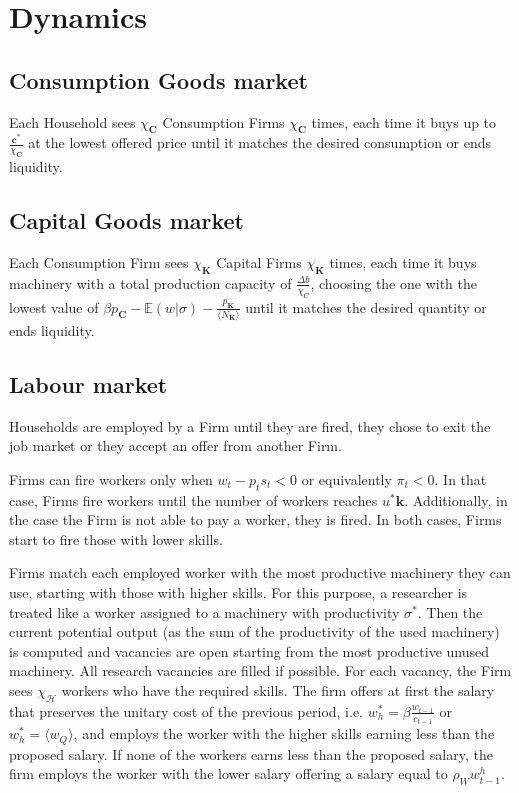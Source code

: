 \documentclass[a4paper, headings=standardclasses]{scrartcl}
\numberwithin{equation}{subsection}
\begin{document}
\section{Dynamics}
\subsection{Consumption Goods market}
Each Household sees $\chi_\mathbf{C}$ Consumption Firms $\chi_\mathbf{C}$ times, each time it buys up to $\frac{\mathbf{c}^*}{\chi_\mathbf{C}}$ at the lowest offered price until it matches the desired consumption or ends liquidity.

\subsection{Capital Goods market}
Each Consumption Firm sees $\chi_\mathbf{K}$ Capital Firms $\chi_\mathbf{K}$ times, each time it buys machinery with a total production capacity of $\frac{\Delta b}{\chi_C}$, choosing the one with the lowest value of $\beta p_\mathbf{C} - \mathbb{E}(w|\sigma) - \frac{p_\mathbf{K}}{\langle N_\mathbf{K} \rangle}$ until it matches the desired quantity or ends liquidity. %

\subsection{Labour market}
Households are employed by a Firm until they are fired, they chose to exit the job market or they accept an offer from another Firm.

Firms can fire workers only when $w_t - p_t s_t < 0$ or equivalently $\pi_t < 0$. In that case, Firms fire workers until the number of workers reaches $u^* \mathbf{k}$. Additionally, in the case the Firm is not able to pay a worker, they is fired. In both cases, Firms start to fire those with lower skills.

Firms match each employed worker with the most productive machinery they can use, starting with those with higher skills. For this purpose, a researcher is treated like a worker assigned to a machinery with productivity $\sigma^*$.
Then the current potential output (as the sum of the productivity of the used machinery) is computed and vacancies are open starting from the most productive unused machinery. All research vacancies are filled if possible.
For each vacancy, the Firm sees $\chi_\mathcal{H}$ workers who have the required skills. The firm offers at first the salary that preserves the unitary cost of the previous period, i.e. $w^*_h = \beta \frac{w_{t-1}}{c_{t-1}}$ or $w^*_h = \langle w_Q \rangle$, and employs the worker with the higher skills earning less than the proposed salary. If none of the workers earns less than the proposed salary, the firm employs the worker with the lower salary offering a salary equal to $\rho_W w^h_{t-1}$.
\end{document}
